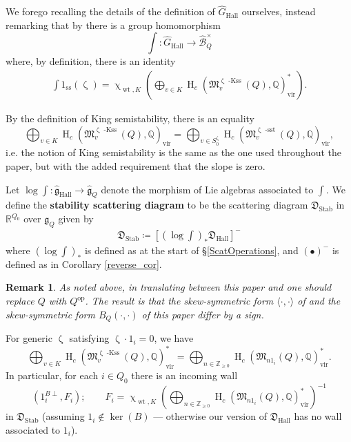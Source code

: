 \documentclass{amsart}
\newcommand{\Mst}{\mathfrak{M}}
\DeclareMathOperator{\opp}{op}
\DeclareMathOperator{\kss}{-Kss}
\DeclareMathOperator{\Wt}{wt}
\DeclareMathOperator{\HO}{H}
\DeclareMathOperator{\sstable}{-sst}
\DeclareMathOperator{\vir}{vir}
\DeclareMathOperator{\Hall}{Hall}
\DeclareMathOperator{\Stab}{Stab}
\let\bb=\mathbb
\let\rar=\rightarrow
\let\f=\mathfrak
\newcommand{\g}[1]{1_{#1}}
\renewcommand{\zeta}{\upzeta}
\renewcommand{\chi}{\upchi}
\theoremstyle{plain}%
\newtheorem{rem}[thm]{Remark}
\theoremstyle{definition}
\theoremstyle{remark}
\begin{document}
We forego recalling the details of the definition of $\hat{G}_{\Hall}$ ourselves, instead remarking that by \cite[Thm 6.1]{joyce2007configurations} there is a group homomorphism 
\[
\int\colon \hat{G}_{\Hall}\rightarrow \hat{\mathscr{B}}_{Q}^{\times}
\]
where, by definition, there is an identity
\begin{align}\label{int1}
\int 1_{\mathrm{ss}}(\zeta)=\chi_{\Wt,K}\left(\bigoplus_{v\in K}\HO_c (\Mst^{\zeta \kss}_{v}(Q),\mathbb{Q})_{\vir}^*\right).
\end{align}

By the definition of King semistability, there is an equality
\[
\bigoplus_{v\in K}\HO_c(\Mst^{\zeta \kss}_{v}(Q),\mathbb{Q})_{\vir}=\bigoplus_{v\in S_0^{\zeta}}\HO_c(\Mst^{\zeta \sstable}_{v}(Q),\mathbb{Q})_{\vir},
\]
i.e. the notion of King semistability is the same as the one used throughout the paper, but with the added requirement that the slope is zero.  


Let $\log \int\colon \hat{\f{g}}_{\Hall} \rar \hat{\f{g}}_Q$ denote the morphism of Lie algebras associated to $\int$.  We define the \textbf{stability scattering diagram} to be the scattering diagram $\f{D}_{\Stab}$ in $\bb{R}^{Q_0}$ over $\f{g}_Q$ given by 
\begin{align*}
    \f{D}_{\Stab}\coloneqq \left[\left(\log \int\right)_* \f{D}_{\Hall}\right]^-
\end{align*}
where $(\log \int)_*$ is defined as at the start of \S \ref{ScatOperations}, and $(\bullet)^-$ is defined as in Corollary \ref{reverse_cor}.

\begin{rem}
As noted above, in translating between this paper and \cite{Bridge} one should replace $Q$ with $Q^{\opp}$.  The result is that the skew-symmetric form $\langle \cdot,\cdot\rangle$ of \cite{Bridge} and the skew-symmetric form $B_Q(\cdot,\cdot)$ of this paper differ by a sign.
\end{rem}


For generic $\zeta$ satisfying $\zeta\cdot \g{i}=0$, we have
\[
\bigoplus_{v\in K}\HO_c(\Mst^{\zeta \kss}_{v}(Q),\mathbb{Q})^*_{\vir}=\bigoplus_{n\in\mathbb{Z}_{\geq 0}}\HO_c(\Mst_{n\g{i}}(Q),\mathbb{Q})^*_{\vir}.
\]
In particular, for each $i\in Q_0$ there is an incoming wall
\begin{equation}
    \label{B_walls_in}
(\g{i}^{B\perp},F_i);\quad\quad F_i=\chi_{\Wt,K}\left(\bigoplus_{n\in\mathbb{Z}_{\geq 0}}\HO_c(\Mst_{n\g{i}}(Q),\mathbb{Q})^*_{\vir}\right)^{-1}
\end{equation}
in $\f{D}_{\Stab}$ (assuming $1_i\notin \ker(B)$ --- otherwise our version of $\f{D}_{\Hall}$ has no wall associated to $1_i$). 
\end{document}
